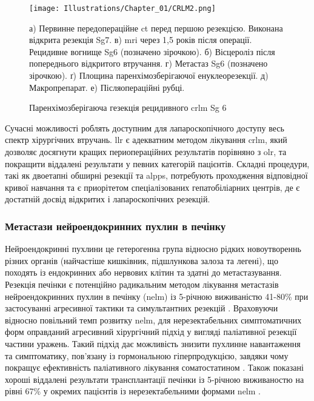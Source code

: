 \begin{refsection}
\begin{figure}[!ht]
\caption{Паренхімозберігаюча гезекція рецидивного \acrshort{crlm} Sg 6}

\texttt{[image: Illustrations/Chapter\_01/CRLM2.png]}
\label{fig:CRLM2}

\medskip
\small
а) Первинне передопераційне \acrshort{ct} перед першою резекцією. Виконана відкрита резекція Sg7. в) \acrshort{mri} через 1,5 років після операції. Рецидивне вогнище Sg6 (позначено зірочкою). б) Вісцероліз після попереднього відкритого втручання. г) Метастаз Sg6 (позначено зірочкою). ґ) Площина паренхімозберігаючої енуклеорезекції. д) Макропрепарат. е) Післяопераційні рубці.

\end{figure}




Сучасні можливості роблять доступним для лапароскопічного доступу весь спектр хірургічних втручань. \acrshort{llr} є адекватним методом лікування \acrshort{crlm}, який дозволяє досягнути кращих периопераційних результатів порівняно з \acrshort{olr}, та покращити віддалені результати у певних категорій пацієнтів. Складні процедури, такі як  двоетапні обширні резекції та \acrshort{alpps}, потребують проходження відповідної кривої навчання та є приорітетом спеціалізованих гепатобіліарних центрів, де є достатній досвід відкритих і лапароскопічних резекцій.

\subsubsection{Метастази нейроендокринних пухлин в печінку}

Нейроендокринні пухлини це гетерогенна група відносно рідких новоутвореннь різних органів (найчастіше кишківник, підшлункова залоза та легені), що походять із ендокринних або нервових клітин та здатні до метастазування. Резекція печінки є потенційно радикальним методом лікування метастазів нейроендокринних пухлин в печінку (\acrshort{nelm}) із 5-річною виживаністю 41-80\% при застосуванні агресивної тактики та симультантних резекцій \cite{Liu2009}. Враховуючи відносно повільний темп розвитку \acrshort{nelm}, для нерезектабельних симптоматичних форм оправданий агресивний хірургічний підхід у вигляді паліативної резекції частини уражень. Такий підхід дає можливість знизити пухлинне навантаження та симптоматику, пов'язану із гормональною гіперпродукцією, завдяки чому покращує ефективність паліативного лікування соматостатином \cite{Schmidt2014}. Також показані хороші віддалені результати трансплантації печінки із 5-річною виживаностю на рівні 67\% у окремих пацієнтів із нерезектабельними формами \acrshort{nelm} \cite{Moris2017a}.


\end{refsection}
